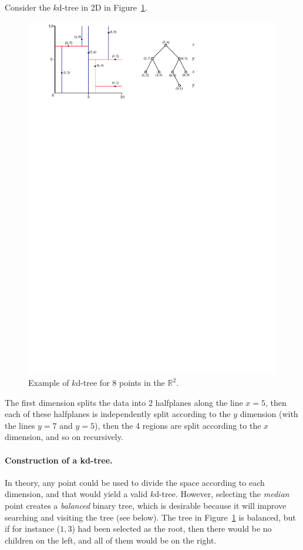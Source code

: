 Consider the $k$d-tree in 2D in Figure~\ref{fig:kdtree2}.
\begin{figure}[tbp]
  \centering
  \includegraphics[width=0.75\linewidth]{figs/kdtree2}
  \caption{Example of $k$d-tree for 8 points in the $\mathbb{R}^2$.}
\label{fig:kdtree2}
\end{figure}
The first dimension splits the data into 2 halfplanes along the line $x=5$, then each of these halfplanes is independently split according to the $y$ dimension (with the lines $y=7$ and $y=5$), then the 4 regions are split according to the $x$ dimension, and so on recursively.

\paragraph{Construction of a kd-tree.}
In theory, any point could be used to divide the space according to each dimension, and that would yield a valid $k$d-tree.
However, selecting the \emph{median} point creates a \emph{balanced} binary tree, which is desirable because it will improve searching and visiting the tree (see below).
The tree in Figure~\ref{fig:kdtree2} is balanced, but if for instance ($1,3$) had been selected as the root, then there would be no children on the left, and all of them would be on the right.

